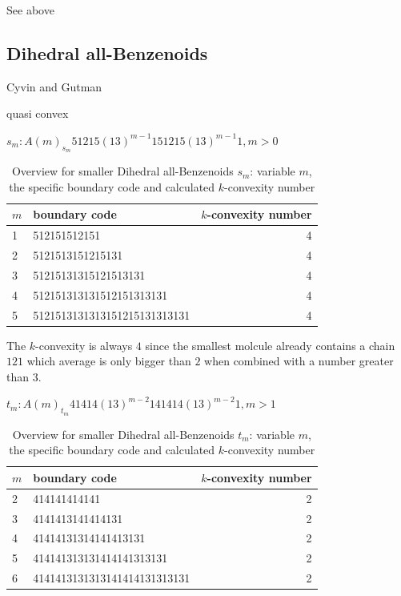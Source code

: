\documentclass[a4paper,10pt]{article}
\begin{document}
{See above


\subsection{Dihedral all-Benzenoids}

Cyvin and Gutman~\cite[p.~215]{cyvin_1988}

quasi convex

$s_m: A(m)_{s_m} 51215(13)^{m-1}151215(13)^{m-1}1, m>0$
\cite{zhang_1986}

\begin{table}
 \caption{Overview for smaller Dihedral all-Benzenoids $s_m$: variable $m$, the specific boundary code and calculated $k$-convexity number}
 \medskip
 \begin{tabular}{|l l r|}
 \hline
  $m$ & boundary code & $k$-convexity number\\
  \hline
  1 & 512151512151 & 4 \\
  2 & 5121513151215131 & 4 \\
  3 & 51215131315121513131 & 4 \\
  4 & 512151313131512151313131 & 4 \\
  5 & 5121513131313151215131313131 & 4 \\
  \hline
 \end{tabular}
\end{table}

The $k$-convexity is always $4$ since the smallest molcule already contains a chain 
$121$ which average is only bigger than $2$ when combined with a number greater than $3$.



$t_m: A(m)_{t_m} 41414(13)^{m-2}141414(13)^{m-2}1, m>1$

\cite{zhang_1986}


\begin{table}
 \caption{Overview for smaller Dihedral all-Benzenoids $t_m$: variable $m$, the specific boundary code and calculated $k$-convexity number}
 \medskip
 \begin{tabular}{|l l r|}
 \hline
  $m$ & boundary code & $k$-convexity number\\
  \hline
  2 & 414141414141 & 2 \\
  3 & 4141413141414131 & 2 \\
  4 & 41414131314141413131 & 2 \\
  5 & 414141313131414141313131 & 2 \\
  6 & 4141413131313141414131313131 & 2 \\
  \hline
 \end{tabular}
\end{table}

}
\end{document}
